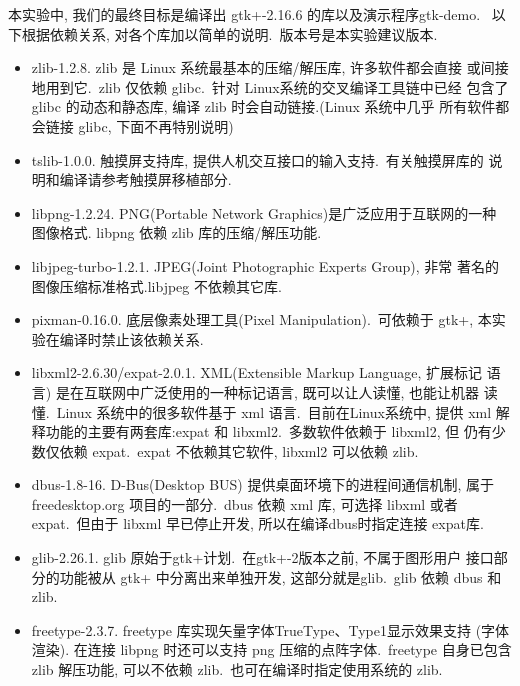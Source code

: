     本实验中, 我们的最终目标是编译出 gtk+-2.16.6 的库以及演示程序gtk-demo.
~以下根据依赖关系, 对各个库加以简单的说明.~版本号是本实验建议版本.
\begin{itemize}
  \item zlib-1.2.8. zlib 是 Linux 系统最基本的压缩/解压库, 许多软件都会直接
      或间接地用到它.~zlib 仅依赖 glibc.~针对 Linux系统的交叉编译工具链中已经
      包含了 glibc 的动态和静态库, 编译 zlib 时会自动链接.(Linux 系统中几乎
      所有软件都会链接 glibc, 下面不再特别说明)

  \item tslib-1.0.0. 触摸屏支持库, 提供人机交互接口的输入支持.~有关触摸屏库的
      说明和编译请参考触摸屏移植部分.

  \item libpng-1.2.24. PNG(Portable Network Graphics)是广泛应用于互联网的一种
      图像格式. libpng 依赖 zlib 库的压缩/解压功能.

  \item libjpeg-turbo-1.2.1. JPEG(Joint Photographic Experts Group), 非常
      著名的图像压缩标准格式.libjpeg 不依赖其它库.

  \item pixman-0.16.0. 底层像素处理工具(Pixel Manipulation).~可依赖于 gtk+,
      本实验在编译时禁止该依赖关系.

  \item libxml2-2.6.30/expat-2.0.1. XML(Extensible Markup Language, 扩展标记
      语言) 是在互联网中广泛使用的一种标记语言, 既可以让人读懂, 也能让机器
      读懂.~Linux 系统中的很多软件基于 xml 语言.~目前在Linux系统中, 提供 xml
      解释功能的主要有两套库:expat 和 libxml2.~多数软件依赖于 libxml2, 但
      仍有少数仅依赖 expat.~expat 不依赖其它软件, libxml2 可以依赖 zlib.

  \item dbus-1.8-16. D-Bus(Desktop BUS) 提供桌面环境下的进程间通信机制, 属于
      freedesktop.org 项目的一部分.~dbus 依赖 xml 库, 可选择 libxml 或者
      expat.~但由于 libxml 早已停止开发, 所以在编译dbus时指定连接 expat库.

  \item glib-2.26.1. glib 原始于gtk+计划.~在gtk+-2版本之前, 不属于图形用户
      接口部分的功能被从 gtk+ 中分离出来单独开发, 这部分就是glib.~glib 依赖
      dbus 和 zlib.

  \item freetype-2.3.7. freetype 库实现矢量字体TrueType、Type1显示效果支持
      (字体渲染). 在连接 libpng 时还可以支持 png 压缩的点阵字体.~freetype
      自身已包含 zlib 解压功能, 可以不依赖 zlib.~也可在编译时指定使用系统的
      zlib.


\end{itemize}
